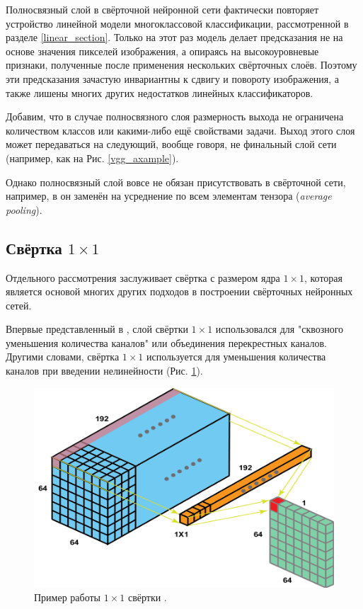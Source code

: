 \documentclass[12pt, fleqn]{article}
\begin{document}
    Полносвязный слой в свёрточной нейронной сети фактически повторяет устройство линейной модели 
    многоклассовой классификации, рассмотренной в разделе \ref{linear_section}. Только на этот раз 
    модель делает предсказания не на основе значения пикселей изображения, а опираясь на высокоуровневые 
    признаки, полученные после применения нескольких свёрточных слоёв. Поэтому эти предсказания зачастую 
    инвариантны к сдвигу и повороту изображения, а также лишены многих других недостатков линейных 
    классификаторов.

    Добавим, что в случае полносвязного слоя размерность выхода не ограничена количеством классов или 
    какими-либо ещё свойствами задачи. Выход этого слоя может передаваться на следующий, вообще говоря, 
    не финальный слой сети (например, как на Рис. \ref{vgg_axample}).

    Однако полносвязный слой вовсе не обязан присутствовать в свёрточной сети, например, в \cite{he2016deep} 
    он заменён на усреднение по всем элементам тензора (\textit{average pooling}).

    \subsection{Свёртка \texorpdfstring{$1 \times 1$}{1x1}} \label{1x1_sec}

    Отдельного рассмотрения заслуживает свёртка с размером ядра $1 \times 1$, которая является 
    основой многих других подходов в построении свёрточных нейронных сетей.

    Впервые представленный в \cite{lin2013network}, 
    слой свёртки $1 \times 1$ использовался для "сквозного уменьшения количества каналов" или 
    объединения перекрестных каналов. Другими словами, свёртка $1 \times 1$ используется для уменьшения 
    количества каналов при введении нелинейности (Рис. \ref{conv_1x1}).

    \begin{figure}[ht]
        \centering
        \includegraphics[scale=0.3]{pics/conv_1x1.png}
        \caption{Пример работы $1 \times 1$ свёртки \cite{1x1_conv}.}
        \label{conv_1x1}
    \end{figure}
\end{document}
